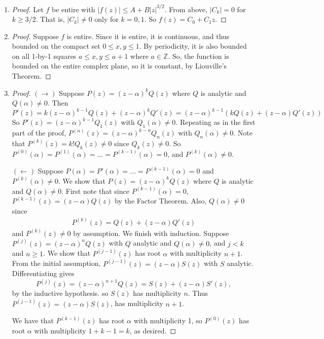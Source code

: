 \documentclass[11pt, letterpaper]{article}
\begin{document}
\begin{enumerate}
  \item \begin{proof}
    Let $f$ be entire with $\vert f(z) \vert \leq A + B \vert z \vert^{3/2}$. From above, $\vert C_k \vert = 0$ for $k \geq 3/2$. That is, $\vert C_k \vert \neq 0$ only for $k = 0, 1$. So $f(z) = C_0 + C_1 z$.
  \end{proof}

  \item \begin{proof}
    Suppose $f$ is entire. Since it is entire, it is continuous, and thus bounded on the compact set $0 \leq x, y \leq 1$. By periodicity, it is also bounded on all 1-by-1 squares $a \leq x, y \leq a + 1$ where $a \in \mathbb Z$. So, the function is bounded on the entire complex plane, so it is constant, by Liouville's Theorem.
  \end{proof}

  \item \begin{proof}
    $(\rightarrow)$ Suppose $P(z) = (z - \alpha)^kQ(z)$ where $Q$ is analytic and $Q(\alpha) \neq 0$. Then
    $$
    P'(z) = k(z - \alpha)^{k - 1}Q(z) + (z - \alpha)^kQ'(z) = (z - \alpha)^{k - 1}(kQ(z) + (z - \alpha)Q'(z))
    $$
    So $P'(z) = (z - \alpha)^{k - 1}Q_1(z)$ with $Q_1(\alpha) \neq 0$. Repeating as in the first part of the proof, $P^{(n)}(z) = (z - \alpha)^{k - n}Q_n(z)$ with $Q_n(\alpha) \neq 0$. Note that $P^{(k)}(z) = k!Q_k(z) \neq 0$ since $Q_k(z) \neq 0$. So $P^{(0)}(\alpha) = P^{(1)}(\alpha) = \dots = P^{(k - 1)}(\alpha) = 0$, and $P^{(k)}(\alpha) \neq 0$.

    $(\leftarrow)$ Suppose $P(\alpha) = P'(\alpha) = \dots = P^{(k - 1)}(\alpha) = 0$ and $P^{(k)}(\alpha) \neq 0$. We show that $P(z) = (z - \alpha)^kQ(z)$ where $Q$ is analytic and $Q(\alpha) \neq 0$. First note that since $P^{(k - 1)}(\alpha) = 0$, $P^{(k - 1)}(z) = (z - \alpha)Q(z)$ by the Factor Theorem. Also, $Q(\alpha) \neq 0$ since \begin{align*}
      P^{(k)}(z) = Q(z) + (z - \alpha)Q'(z)
    \end{align*}
    and $P^{(k)}(z) \neq 0$ by assumption. We finish with induction. Suppose $P^{(j)}(z) = (z - \alpha)^nQ(z)$ with $Q$ analytic and $Q(\alpha) \neq 0$, and $j < k$ and $n \geq 1$. We show that $P^{(j - 1)}(z)$ has root $\alpha$ with multiplicity $n + 1$. From the initial assumption, $P^{(j - 1)}(z) = (z - \alpha)S(z)$ with $S$ analytic. Differentiating gives 
    $$
    P^{(j)}(z) = (z - \alpha)^{n + 1}Q(z) = S(z) + (z - \alpha)S'(z),
    $$
    by the inductive hypothesis. so $S(z)$ has multiplicity $n$. Thus $P^{(j - 1)}(z) = (z - \alpha)S(z)$, has multiplicity $n + 1$.

    We have that $P^{(k - 1)}(z)$ has root $\alpha$ with multiplicity 1, so $P^{(0)}(z)$ has root $\alpha$ with multiplicity $1 + k - 1 = k$, as desired.
  \end{proof}
\end{enumerate}
\end{document}
